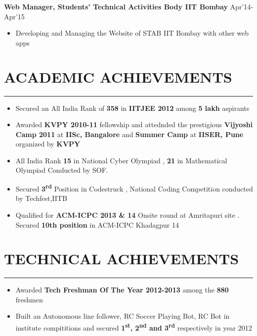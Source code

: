 \documentclass[11pt]{article} %
\begin{document}
\noindent \textbf{Web Manager, Students' Technical Activities Body IIT Bombay} \hfill Apr'14-Apr'15
\vspace{-2mm}
\begin{itemize}
\itemsep-0.3em
\item Developing and Managing the Website of STAB IIT Bombay with other web apps 
\end{itemize}
\vspace{-7mm}


\section*{ACADEMIC ACHIEVEMENTS}
\vspace{-2mm}
\hrule
\medskip
\begin{itemize}
\itemsep-0.4em
\item Secured an All India Rank of {\bf 358} in {\bf IITJEE 2012} among {\bf 5 lakh} aspirants
\item Awarded {\bf KVPY 2010-11} fellowship and  attednded the prestigious {\bf Vijyoshi Camp 2011} at {\bf IISc, Bangalore} and {\bf Summer 
Camp} at {\bf IISER, Pune} organized by {\bf KVPY}
\item All India Rank {\bf 15} in National Cyber Olympiad , {\bf 21} in Mathematical Olympiad Conducted by SOF.
\item Secured {\bf 3\textsuperscript{rd}} Position in Codestruck , National Coding Competition conducted by Techfest,IITB
\item Qualified for \textbf{ACM-ICPC 2013 \& 14} Onsite round at Amritapuri site . Secured \textbf{10th position} in ACM-ICPC Khadagpur 14
\end{itemize}
\vspace{-8mm}

\section*{TECHNICAL ACHIEVEMENTS}
\vspace{-2mm}
\hrule
\medskip

\begin{itemize}
\itemsep-0.4em
\item Awarded {\bf Tech Freshman Of The Year 2012-2013} among the {\bf 880} freshmen
\item Built an Autonomous line follower, RC Soccer Playing Bot, RC Bot in institute compititions and secured {\bf 1\textsuperscript{st}, 2\textsuperscript{nd} and 3\textsuperscript{rd} } respectively in year 2012
\end{itemize}
\vspace{-8mm}
\end{document}
